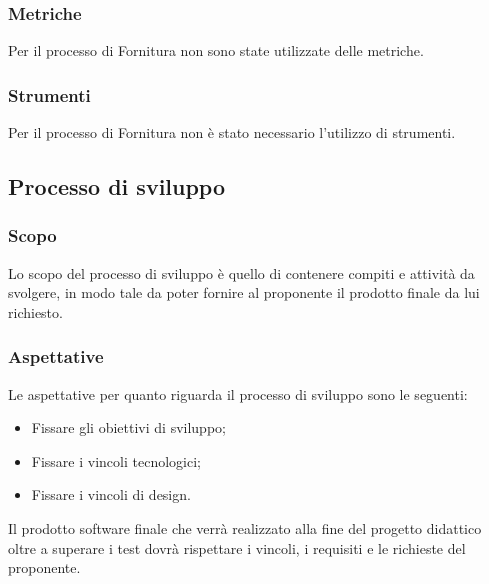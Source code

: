 

\subsubsection{Metriche} 
Per il processo di Fornitura non sono state utilizzate delle metriche.

\subsubsection{Strumenti} 
Per il processo di Fornitura non è stato necessario l'utilizzo di strumenti.

\newpage

\subsection{Processo di sviluppo}
\subsubsection{Scopo}
Lo scopo del processo di sviluppo è quello di contenere compiti e attività da svolgere, in modo tale da poter fornire al proponente il prodotto finale da lui richiesto.\\
\subsubsection{Aspettative}
Le aspettative per quanto riguarda il processo di sviluppo sono le seguenti:
\begin{itemize}
	\item Fissare gli obiettivi di sviluppo;
	\item Fissare i vincoli tecnologici;
	\item Fissare i vincoli di design.
\end{itemize}
Il prodotto software finale che verrà realizzato alla fine del progetto didattico oltre a superare i test dovrà rispettare i vincoli, i requisiti e le richieste del proponente.
